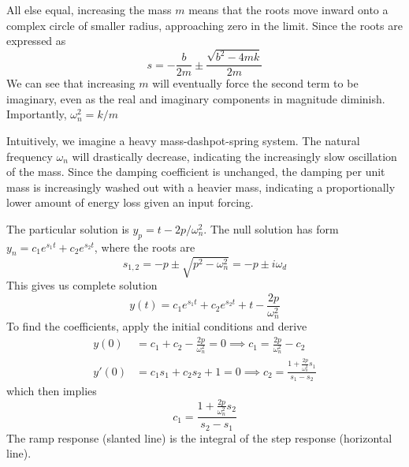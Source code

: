 \documentclass[a4paper]{article}
\begin{document}

All else equal, increasing the mass \( m  \) means that the roots move inward onto a complex circle of smaller radius, approaching zero in the limit. Since the roots are expressed as 
\[
	s = -\frac{b }{2m} \pm \frac{\sqrt{b^{2} - 4mk}}{2m}
\]
We can see that increasing \( m  \) will eventually force the second term to be imaginary, even as the real and imaginary components in magnitude diminish. Importantly, \( \omega^{2}_{n} = k/m \) 

Intuitively, we imagine a heavy mass-dashpot-spring system. The natural frequency \( \omega_{n } \) will drastically decrease, indicating the increasingly slow oscillation of the mass. Since the damping coefficient is unchanged, the damping per unit mass is increasingly washed out with a heavier mass, indicating a proportionally lower amount of energy loss given an input forcing.

\vspace{12pt}

\newpage

The particular solution is \( y_{p } = t - 2p / \omega^{2}_{n} \). The null solution has form \( y_{n } = c_{1}e^{s_{1}t } + c_{2}e^{s_{2}t } \), where the roots are
\[
	s_{1,2} = -p \pm \sqrt{p^{2} - \omega^{2}_{n }} = -p \pm i \omega_{d} 
\]
This gives us complete solution
\[
	y \!\left( t  \right) = c_{1}e^{s_{1}t } + c_{2}e^{s_{2}t } + t - \frac{2p}{\omega^{2}_{n}}
\]
To find the coefficients, apply the initial conditions and derive
\begin{align*}
	y \!\left( 0 \right) & = c_{1} + c_{2} - \frac{2p}{\omega^{2}_{n}} = 0 \implies \boxed{c_{1} = \frac{2p}{\omega^{2}_{n}} - c_{2}} \\[12pt]
	y'\!\left( 0 \right) & = c_{1}s_{1} + c_{2}s_{2} + 1 = 0 \implies \boxed{c_{2} = \frac{1 + \frac{2p}{\omega^{2}_{n}}s_{1}}{s_{1} - s_{2}}}
\end{align*}
which then implies
\[
	\boxed{c_{1} = \frac{1 + \frac{2p}{\omega^{2}_{n}}s_{2}}{s_{2} - s_{1}} }
\]
The ramp response (slanted line) is the integral of the step response (horizontal line). 
\end{document}
